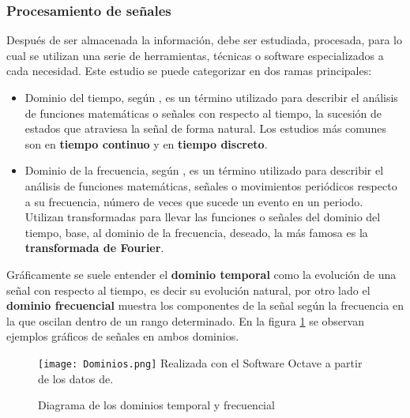 \subsubsection{Procesamiento de señales}

Después de ser almacenada la información, debe ser estudiada, procesada, para lo
cual se utilizan una serie de herramientas, técnicas o software especializados
a cada necesidad. Este estudio se puede categorizar en dos ramas principales:

\begin{itemize}
    \item Dominio del tiempo, según \cite{wiki:DominioTiempo}, es un término
        utilizado para describir el análisis
        de funciones matemáticas o señales con respecto al tiempo, la sucesión
        de estados que atraviesa la señal de forma natural. Los estudios más
        comunes son en  \textbf{tiempo continuo} y en \textbf{tiempo discreto}.

    \item Dominio de la frecuencia, según \cite{wiki:DominioFrecuencia}, es un
        término utilizado para describir el análisis
        de funciones matemáticas, señales o movimientos periódicos respecto a
        su frecuencia, número de veces que sucede un evento en un periodo.
        Utilizan transformadas para llevar las funciones o señales del dominio
        del tiempo, base, al dominio de la frecuencia, deseado, la más famosa es
        la \textbf{transformada de Fourier}.
\end{itemize}


Gráficamente se suele entender el \textbf{dominio temporal} como la evolución
de una señal con respecto al tiempo, es decir su evolución natural, por otro
lado el \textbf{dominio frecuencial} muestra los componentes de la señal según
la frecuencia en la que oscilan dentro de un rango determinado.
En la figura \ref{Dominios} se observan ejemplos gráficos de señales en ambos
dominios.

	\begin{figure}[htb]
		\centering
        \caption{ Diagrama de los dominios temporal y frecuencial}
        \texttt{[image: Dominios.png]}
        Realizada con el Software Octave a partir de los datos de.
                \Cite{HUANG20181745}
        \label{Dominios}

	\end{figure}



